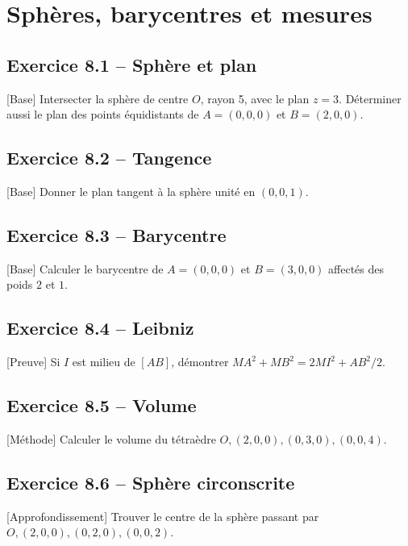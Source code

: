 \chapter{Sphères, barycentres et mesures}
\section*{Exercice 8.1 -- Sphère et plan}
[Base] Intersecter la sphère de centre $O$, rayon 5, avec le plan $z=3$. Déterminer aussi le plan des points équidistants de $A=(0,0,0)$ et $B=(2,0,0)$.

\section*{Exercice 8.2 -- Tangence}
[Base] Donner le plan tangent à la sphère unité en $(0,0,1)$.

\section*{Exercice 8.3 -- Barycentre}
[Base] Calculer le barycentre de $A=(0,0,0)$ et $B=(3,0,0)$ affectés des poids $2$ et $1$.

\section*{Exercice 8.4 -- Leibniz}
[Preuve] Si $I$ est milieu de $[AB]$, démontrer $MA^2+MB^2=2MI^2+AB^2/2$.

\section*{Exercice 8.5 -- Volume}
[Méthode] Calculer le volume du tétraèdre $O,(2,0,0),(0,3,0),(0,0,4)$.

\section*{Exercice 8.6 -- Sphère circonscrite}
[Approfondissement] Trouver le centre de la sphère passant par $O,(2,0,0),(0,2,0),(0,0,2)$.

